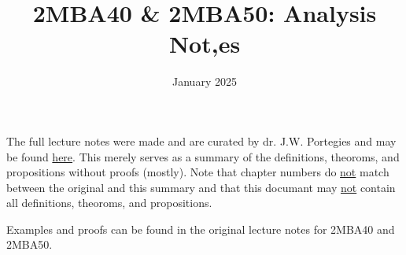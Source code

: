 \documentclass[fleqn]{article}
\title{2MBA40 \& 2MBA50: Analysis Not,es}
\author{}
\date{January 2025}
\newcommand{\ul}[1]{\underline{#1}}
\begin{document}
\maketitle

The full lecture notes were made and are curated by dr. J.W. Portegies and may be found
\href{https://gitlab.tue.nl/jim-portegies/analysis}{here}. This merely
serves as a summary of the definitions, theoroms, and propositions
without proofs (mostly). Note that chapter numbers do \ul{not} match between
the original and this summary and that this documant may \ul{not} contain
all definitions, theoroms, and propositions.

Examples and proofs can be found in the original lecture notes for 2MBA40 and 2MBA50.











\end{document}
